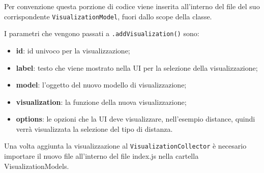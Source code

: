         Per convenzione questa porzione di codice viene inserita all'interno del file del suo corrispondente \texttt{VisualizationModel}, fuori dallo scope della classe.
        
        I parametri che vengono passati a \texttt{.addVisualization()} sono:
        \begin{itemize}
            \item \textbf{id}: id univoco per la visualizzazione;
            \item \textbf{label}: testo che viene mostrato nella UI per la selezione della visualizzazione;
            \item \textbf{model}: l'oggetto del nuovo modello di visualizzazione;
            \item \textbf{visualization}: la funzione della nuova visualizzazione;
            \item \textbf{options}: le opzioni che la UI deve visualizzare, nell'esempio distance, quindi verrà visualizzata la selezione del tipo di distanza.
        \end{itemize}
    
        Una volta aggiunta la visualizzazione al \texttt{VisualizationCollector} è necesario importare il nuovo file all'interno del file index.js nella cartella VisualizationModels.
        
